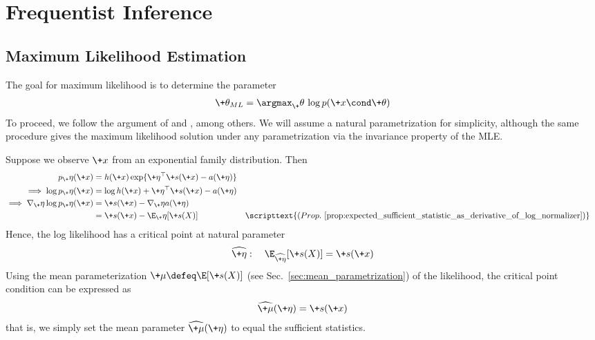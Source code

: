 \documentclass{article} %
\newcommand{\obs}{\+x}
\newcommand{\obsCaps}{X}
\newcommand{\logNormalizerFunction}{a}
\newcommand{\sufficientStatsFunction}{\+s}
\newcommand{\carrierDensity}{h}
\newcommand{\meanParam}{\+\mu}
\newcommand{\param}{\+\theta}
\newcommand{\naturalParam}{\+\eta}
\begin{document}
\section{Frequentist Inference}

\subsection{Maximum Likelihood Estimation}
\label{sec:ml_with_ef}


The goal for maximum likelihood is to determine the parameter
%
\begin{align}
\param_{ML} = \argmax_\param  \, \log p(\+x \cond \param) 
\label{eqn:ml}
\end{align}
%
To proceed, we follow the argument of \citet{dempster1977maximum} and \citet{jordan2010exponential}, among others.   We will assume a natural parametrization for simplicity, although the same procedure gives the maximum likelihood solution under any parametrization via the invariance property of the MLE.

Suppose we observe $\obs$ from an exponential family distribution. Then 
%
\begin{align*}
 p_\naturalParam(\obs) &= \carrierDensity(\obs) \exp \{ \naturalParam^\top \sufficientStatsFunction(\obs) - \logNormalizerFunction(\naturalParam)\}  \\
\implies \log  p_\naturalParam(\obs) &= \log \carrierDensity(\obs) +  \naturalParam^\top \sufficientStatsFunction(\obs) - \logNormalizerFunction(\naturalParam) \\
 \implies \nabla_\naturalParam \log  p_\naturalParam(\obs) &= \sufficientStatsFunction(\obs) - \nabla_\naturalParam \logNormalizerFunction(\naturalParam) 
 \\ &= \sufficientStatsFunction(\obs) - \E_\naturalParam[\sufficientStatsFunction(\obsCaps)] && \scripttext{(Prop.~ \ref{prop:expected_sufficient_statistic_as_derivative_of_log_normalizer})}
 \end{align*}
%
Hence, the log likelihood has a critical point at natural parameter 
%
\begin{align}
\widehat{\naturalParam} : \quad   \E_{\widehat{\naturalParam}}[\sufficientStatsFunction(\obsCaps)] = \sufficientStatsFunction(\obs)
\label{eqn:condition_for_critical_point_of_EF_likelihood}
\end{align}
% 
Using the mean parameterization $\meanParam \defeq \E[\sufficientStatsFunction(X)]$ (see Sec.~\ref{sec:mean_parametrization}) of the likelihood,  the critical point condition can be expressed as 
%
\begin{align}\widehat{\meanParam}(\naturalParam) = \sufficientStatsFunction(\obs)
\label{eqn:condition_for_critical_point_of_EF_likelihood__under_mean_parametrization}
\end{align}
% 
that is, we simply set the mean parameter $\widehat{\meanParam}(\naturalParam)$ to equal the sufficient statistics.
\end{document}
